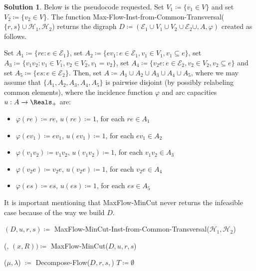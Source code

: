 \documentclass[11pt,leqno,final]{amsart}
\theoremstyle{definition}
\newtheorem{solution}{Solution}
\begin{document}
\begin{solution}
  Below is the pseudocode requested. Set $V_1 \coloneqq \{v_1 \in V \}$ and set $V_2 \coloneqq \{v_2 \in V \}$. The function Max-Flow-Inst-from-Common-Transversal($\{r,s\} \cup \mathcal{H}_1, \mathcal{H}_2$) returns the digraph $D \coloneqq (\mathcal{E}_1 \cup V_1 \cup V_2 \cup \mathcal{E}_2 \cup, A, \varphi)$ created as follows. 
  
  Set $A_1 \coloneqq \{re: e \in \mathcal{E}_1\}$, set $A_2 \coloneqq \{ev_1: e \in \mathcal{E}_1, v_1 \in V_1, v_1 \subseteq e\}$, set $A_3 \coloneqq \{v_1v_2: v_1 \in V_1, v_2 \in V_2, v_1 = v_2\}$, set $A_4 \coloneqq \{v_2e: e \in \mathcal{E}_2, v_2 \in V_2, v_2 \subseteq e\}$ and set $A_5 \coloneqq \{es: e \in \mathcal{E}_2\}$. Then, set $A \coloneqq A_1 \cup A_2 \cup A_3 \cup A_4 \cup A_5$, where we may assume that $\{A_1, A_2, A_3, A_4, A_5\}$ is pairwise disjoint (by possibly relabeling common elements), where the incidence function $\varphi$ and arc capacities $u: A \to \Reals_{+}$ are:
  \begin{itemize}
    \item $\varphi(re) \coloneqq re$, $u(re) \coloneqq 1$, for each $re \in A_1$
    \item $\varphi(ev_1) \coloneqq ev_1$, $u(ev_1) \coloneqq \mathcal{1}$, for each $ev_1 \in A_2$
    \item $\varphi(v_1v_2) \coloneqq v_1v_2$, $u(v_1v_2) \coloneqq 1$, for each $v_1v_2 \in A_3$
    \item $\varphi(v_2e) \coloneqq v_2e$, $u(v_2e) \coloneqq \mathcal{1}$, for each $v_2e \in A_4$
    \item $\varphi(es) \coloneqq es$, $u(es) \coloneqq 1$, for each $es \in A_5$
  \end{itemize}

  It is important mentioning that MaxFlow-MinCut never returns the infeasible case because of the way we build $D$.

  \begin{algorithm}
    \caption{Common-Transversal($D$, $u$, $b$)}\label{ctrans}
    \begin{algorithmic}[1]

      \State $(D, u, r, s) \coloneqq$ MaxFlow-MinCut-Inst-from-Common-Transversal($\mathcal{H}_1, \mathcal{H}_2$)
      
      \State (\underline{\hspace{.15in}}, $(x, R)) \coloneqq$ MaxFlow-MinCut($D, u, r, s$)

        \State ($\mu, \lambda$) $\coloneqq$ Decompose-Flow($D, r, s,$)
        \State $T \coloneqq \emptyset$


\end{algorithmic}
\end{algorithm}
\end{solution}
\end{document}
